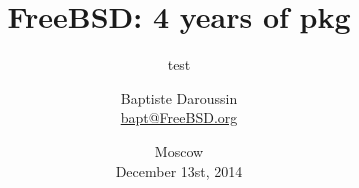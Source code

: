 
\newcommand{\prestitle}{RuBSD 14}

\title{FreeBSD: 4 years of pkg}
\subtitle{test}
\author{Baptiste Daroussin \\ \url{bapt@FreeBSD.org}}
\date{Moscow \\ December 13st, 2014}



\begin{frame}[plain]
	\titlepage
\end{frame}

